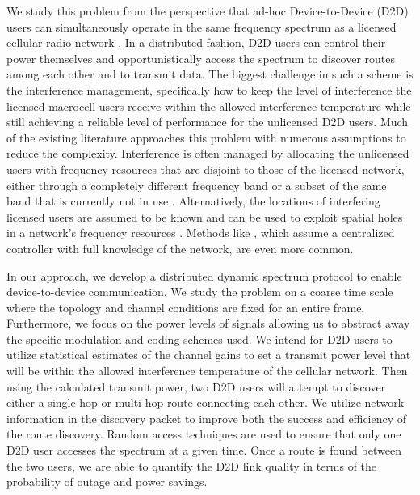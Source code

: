 \documentclass[10pt, final, journal, letterpaper,oneside, twocolumn]{IEEEtran}
\begin{document}
We study this problem from the perspective that ad-hoc Device-to-Device (D2D) users can simultaneously operate in the same frequency spectrum as a licensed cellular radio network \cite{bkaufman_t1,bkaufman_c2,D2D_doppler_review}.  In a distributed fashion, D2D users can control their power themselves and opportunistically access the spectrum to discover routes among each other and to transmit data.  The biggest challenge in such a scheme is the interference management, specifically how to keep the level of interference the licensed macrocell users receive within the allowed interference temperature while still achieving a reliable level of performance for the unlicensed D2D users.  Much of the existing literature approaches this problem with numerous assumptions to reduce the complexity.  Interference is often managed by allocating the unlicensed users with frequency resources that are disjoint to those of the licensed network, either through a completely different frequency band or a subset of the same band that is currently not in use \cite{cellular_adhoc}.  Alternatively, the locations of interfering licensed users are assumed to be known and can be used to exploit spatial holes in a network's frequency resources \cite{location_known}.  Methods like \cite{decentralized_control}, which assume a centralized controller with full knowledge of the network, are even more common.  



In our approach, we develop a distributed dynamic spectrum protocol to enable device-to-device communication.  We study the problem on a coarse time scale where the topology and channel conditions are fixed for an entire frame.  Furthermore, we focus on the power levels of signals allowing us to abstract away the specific modulation and coding schemes used.  We intend for D2D users to utilize statistical estimates of the channel gains to set a transmit power level that will be within the allowed interference temperature of the cellular network.  Then using the calculated transmit power, two D2D users will attempt to discover either a single-hop or multi-hop route connecting each other.  We utilize network information in the discovery packet to improve both the success and efficiency of the route discovery.  Random access techniques are used to ensure that only one D2D user accesses the spectrum at a given time.  Once a route is found between the two users, we are able to quantify the D2D link quality in terms of the probability of outage and power savings.  
\end{document}
